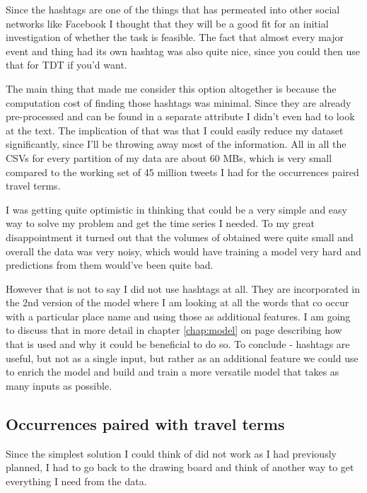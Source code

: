 \documentclass[minf,frontabs,twoside,singlespacing,parskip]{infthesis}
\begin{document}
Since the hashtags are one of the things that has permeated into other social networks like Facebook I thought that they will be a good fit for an initial investigation of whether the task is feasible. The fact that almost every major event and thing had its own hashtag was also quite nice, since you could then use that for TDT if you'd want.


The main thing that made me consider this option altogether is because the computation cost of finding those hashtags was minimal. Since they are already pre-processed and can be found in a separate attribute I didn't even had to look at the text. The implication of that was that I could easily reduce my dataset significantly, since I'll be throwing away most of the information. All in all the CSVs for every partition of my data are about 60 MBs, which is very small compared to the working set of 45 million tweets I had for the occurrences paired travel terms. 


I was getting quite optimistic  in thinking that could be a very simple and easy way to solve my problem and get the time series I needed. To my great disappointment it turned out that the volumes of obtained were quite small and overall the data was very noisy, which would have training a model very hard and predictions from them would've been quite bad. 


However that is not to say I did not use hashtags at all. They are incorporated in the 2nd version of the model where I am looking at all the words that co occur with a particular place name and using those as additional features. I am going to discuss that in more detail in chapter \ref{chap:model} on page \pageref{chap:model} describing how that is used and why it could be beneficial to do so. To conclude - hashtags are useful, but not as a single input, but rather as an additional feature we could use to enrich the model and build and train a more versatile model that takes as many inputs as possible. 



\subsection{Occurrences paired with travel terms} 
\label{sec:tweettext}

Since the simplest solution I could think of did not work as I had previously planned, I had to go back to the drawing board and think of another way to get everything I need from the data. 
\end{document}
